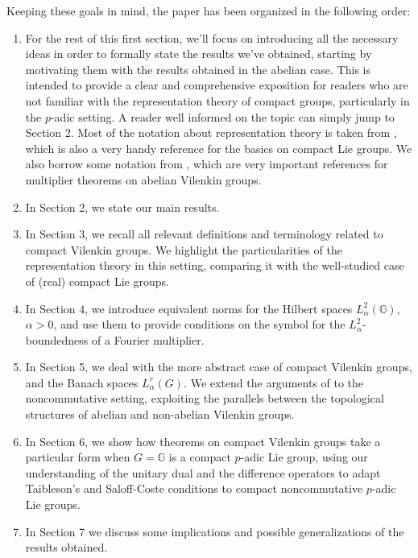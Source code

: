 \documentclass[12pt, reqno]{amsart}
\newcommand{\1}{\mathds{1}}
\begin{document}
Keeping these goals in mind, the paper has been organized in the following order:

\begin{enumerate}
    \item For the rest of this first section, we’ll focus on introducing all the necessary ideas in order to formally state the results we’ve obtained, starting by motivating them with the results obtained in the abelian case. This is intended to provide a clear and comprehensive exposition for readers who are not familiar with the representation theory of compact groups, particularly in the $p$-adic setting. A reader well informed on the topic can simply jump to Section 2. Most of the notation about representation theory is taken from \cite{Ruzhansky2010}, which is also a very handy reference for the basics on compact Lie groups. We also borrow some notation from \cite{Onneweer1985, Onneweer1989}, which are very important references for multiplier theorems on abelian Vilenkin groups.  
    \item In Section 2, we state our main results.
    \item In Section 3, we recall all relevant definitions and terminology related to compact Vilenkin groups. We highlight the particularities of the representation theory in this setting, comparing it with the well-studied case of (real) compact Lie groups.
    \item In Section 4, we introduce equivalent norms for the Hilbert spaces $L^2_\alpha(\mathbb{G})$, $\alpha>0$, and use them to provide conditions on the symbol for the $L^2_\alpha$-boundedness of a Fourier multiplier.
    \item In Section 5, we deal with the more abstract case of compact Vilenkin groups, and the Banach spaces $L^r_\alpha (G)$. We extend the arguments of \cite{Onneweer1985} to the noncommutative setting, exploiting the parallels between the topological structures of abelian and non-abelian Vilenkin groups.
    \item In Section 6, we show how theorems on compact Vilenkin groups take a particular form when $G = \mathbb{G}$ is a compact $p$-adic Lie group, using our understanding of the unitary dual and the difference operators to adapt Taibleson’s and Saloff-Coste conditions \cite{Taibleson1970, SaloffCoste1986} to compact noncommutative $p$-adic Lie groups.
    \item In Section 7 we discuss some implications and possible generalizations of the results obtained.
\end{enumerate}
\end{document}

